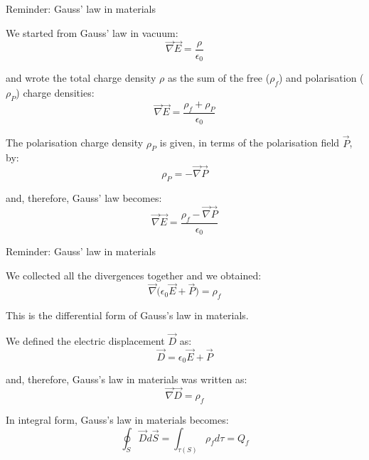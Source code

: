 {
\reminderslide

%
%
%

\begin{frame}{Reminder: Gauss' law in materials}

We started from Gauss’ law in vacuum:
\begin{equation*}
  \vec{\nabla} \vec{E} = \frac{\rho}{\epsilon_0}
\end{equation*}

and wrote the total charge density $\rho$ as the sum of the free ($\rho_{f}$)
and polarisation ($\rho_{P}$) charge densities:
\begin{equation*}
  \vec{\nabla} \vec{E} = \frac{\rho_{f} + \rho_{P}}{\epsilon_0}
\end{equation*}

The polarisation charge density $\rho_{P}$ is given, in terms of the polarisation field $\vec{P}$, by:
\begin{equation*}
  \rho_{P} = - \vec{\nabla}\vec{P}
\end{equation*}

and, therefore, Gauss' law becomes:
\begin{equation*}
  \vec{\nabla} \vec{E} = \frac{\rho_{f} - \vec{\nabla}\vec{P}}{\epsilon_0}
\end{equation*}

\end{frame}

%
%
%

\begin{frame}{Reminder: Gauss' law in materials}

We collected all the divergences together and we obtained:
\begin{equation*}
  \vec{\nabla} \Big( \epsilon_0 \vec{E} + \vec{P} \Big) = \rho_{f}
\end{equation*}

This is the differential form of Gauss's law in materials.\\
\vspace{0.2cm}

We defined the electric displacement $\vec{D}$ as:
\begin{equation*}
  \vec{D} = \epsilon_0 \vec{E} + \vec{P}
\end{equation*}

and, therefore, Gauss's law in materials was written as:
\begin{equation*}
  \vec{\nabla} \vec{D} = \rho_{f}
\end{equation*}

In integral form,  Gauss's law in materials becomes:
\begin{equation*}
  \oint_{S} \vec{D} d\vec{S} = \int_{\tau(S)} \rho_{f} d\tau = Q_{f}
\end{equation*}

\end{frame}

} %

